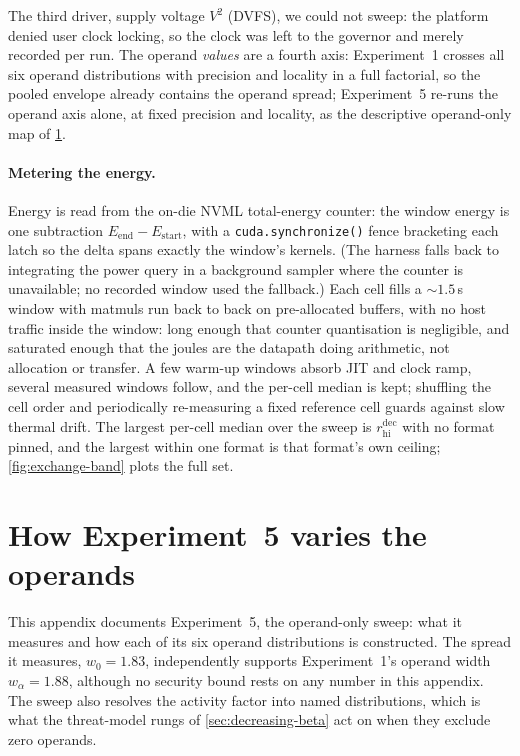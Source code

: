 \documentclass{article}
\theoremstyle{plain}
\theoremstyle{definition}
\theoremstyle{remark}
\begin{document}
The third driver, supply voltage $V^2$ (DVFS), we could not sweep: the
platform denied user clock locking, so the clock was left to the governor
and merely recorded per run. The operand \emph{values} are a fourth axis:
Experiment~1 crosses all six operand distributions
with precision and locality in a full factorial, so the pooled envelope
already contains the operand spread; Experiment~5 re-runs the operand axis
alone, at fixed precision and locality, as the descriptive operand-only map
of \cref{app:operands}.

\paragraph{Metering the energy.}
Energy is read from the on-die NVML total-energy counter: the window energy
is one subtraction $E_{\mathrm{end}} - E_{\mathrm{start}}$, with a \texttt{cuda.synchronize()} fence
bracketing each latch so the delta spans exactly the window's kernels.
(The harness falls back to integrating the power query in a background
sampler where the counter is unavailable; no recorded window used the
fallback.) Each cell fills a ${\sim}1.5$\,s window with matmuls
run back to back on pre-allocated buffers, with no host traffic inside the
window: long enough that counter quantisation is negligible, and saturated
enough that the joules are the datapath doing arithmetic, not allocation or
transfer. A few warm-up windows absorb JIT and clock ramp, several measured
windows follow, and the per-cell median is kept; shuffling the cell order
and periodically re-measuring a fixed reference cell guards against slow
thermal drift. The largest per-cell median over the sweep is
$r_{\mathrm{hi}}^{\mathrm{dec}}$ with no format pinned, and the largest within
one format is that format's own ceiling;
\cref{fig:exchange-band} plots the full set.

\section{How Experiment~5 varies the operands}
\label{app:operands}

This appendix documents Experiment~5, the operand-only sweep: what it
measures and how each of its six operand distributions is constructed. The spread it measures,
$w_0 = 1.83$, independently supports Experiment~1's operand width
$w_\alpha = 1.88$, although no security bound rests on any number in this
appendix. The sweep also resolves the activity factor into named
distributions, which is what the threat-model rungs of
\cref{sec:decreasing-beta} act on when they exclude zero operands.
\end{document}
